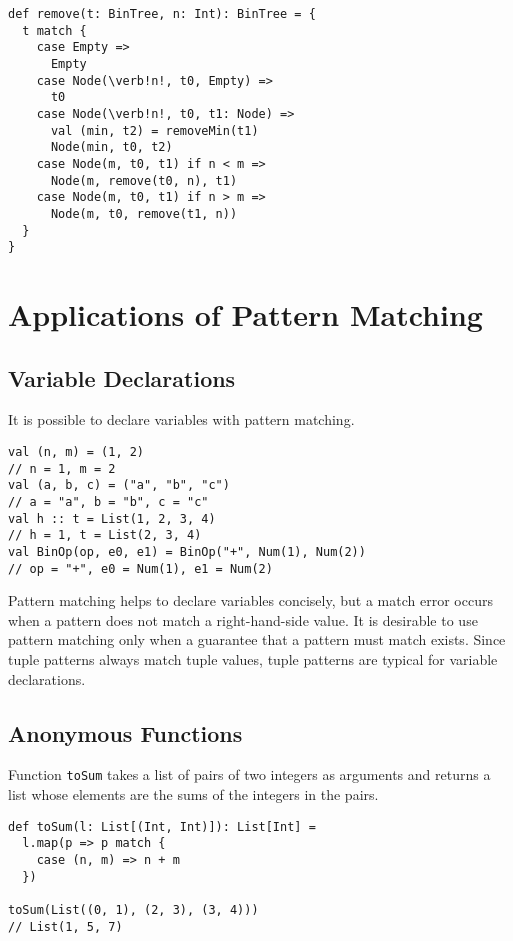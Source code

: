\begin{verbatim}
def remove(t: BinTree, n: Int): BinTree = {
  t match {
    case Empty =>
      Empty
    case Node(\verb!n!, t0, Empty) =>
      t0
    case Node(\verb!n!, t0, t1: Node) =>
      val (min, t2) = removeMin(t1)
      Node(min, t0, t2)
    case Node(m, t0, t1) if n < m =>
      Node(m, remove(t0, n), t1)
    case Node(m, t0, t1) if n > m =>
      Node(m, t0, remove(t1, n))
  }
}
\end{verbatim}

\section{Applications of Pattern Matching}

\subsection{Variable Declarations}

It is possible to declare variables with pattern matching.

\begin{verbatim}
val (n, m) = (1, 2)
// n = 1, m = 2
val (a, b, c) = ("a", "b", "c")
// a = "a", b = "b", c = "c"
val h :: t = List(1, 2, 3, 4)
// h = 1, t = List(2, 3, 4)
val BinOp(op, e0, e1) = BinOp("+", Num(1), Num(2))
// op = "+", e0 = Num(1), e1 = Num(2)
\end{verbatim}

Pattern matching helps to declare variables concisely, but a match error occurs
when a pattern does not match a right-hand-side value. It is desirable to use
pattern matching only when a guarantee that a pattern must match exists. Since
tuple patterns always match tuple values, tuple patterns are typical for variable
declarations.

\subsection{Anonymous Functions}

Function \verb!toSum! takes a list of pairs of two integers as arguments and
returns a list whose elements are the sums of the integers in the pairs.

\begin{verbatim}
def toSum(l: List[(Int, Int)]): List[Int] =
  l.map(p => p match {
    case (n, m) => n + m
  })

toSum(List((0, 1), (2, 3), (3, 4)))
// List(1, 5, 7)
\end{verbatim}

